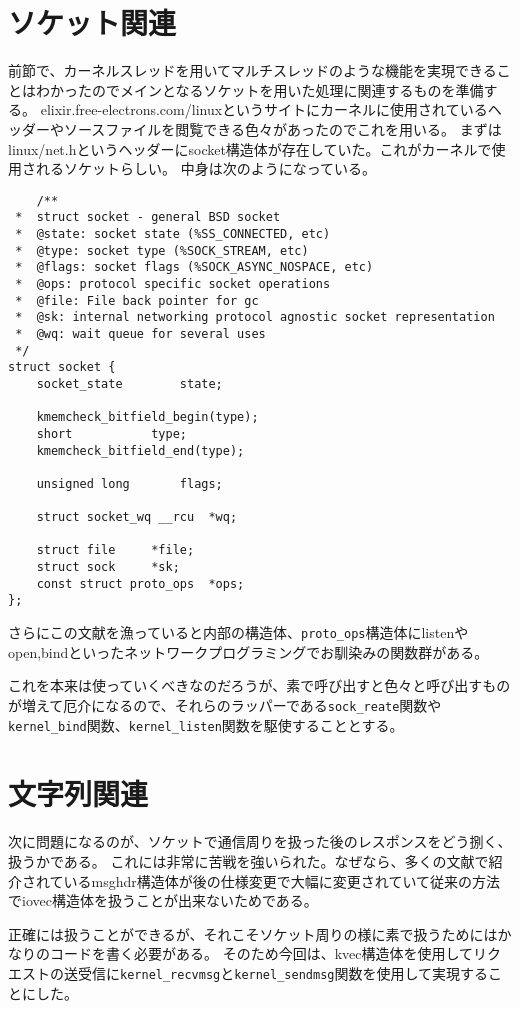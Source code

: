 \section{ソケット関連}

前節で、カーネルスレッドを用いてマルチスレッドのような機能を実現できることはわかったのでメインとなるソケットを用いた処理に関連するものを準備する。
elixir.free-electrons.com/linuxというサイトにカーネルに使用されているヘッダーやソースファイルを閲覧できる色々があったのでこれを用いる。
まずはlinux/net.hというヘッダーにsocket構造体が存在していた。これがカーネルで使用されるソケットらしい。
中身は次のようになっている。
\begin{verbatim}
    /**
 *  struct socket - general BSD socket
 *  @state: socket state (%SS_CONNECTED, etc)
 *  @type: socket type (%SOCK_STREAM, etc)
 *  @flags: socket flags (%SOCK_ASYNC_NOSPACE, etc)
 *  @ops: protocol specific socket operations
 *  @file: File back pointer for gc
 *  @sk: internal networking protocol agnostic socket representation
 *  @wq: wait queue for several uses
 */
struct socket {
	socket_state		state;

	kmemcheck_bitfield_begin(type);
	short			type;
	kmemcheck_bitfield_end(type);

	unsigned long		flags;

	struct socket_wq __rcu	*wq;

	struct file		*file;
	struct sock		*sk;
	const struct proto_ops	*ops;
};
\end{verbatim}

さらにこの文献を漁っていると内部の構造体、\verb|proto_ops|構造体にlistenやopen,bindといったネットワークプログラミングでお馴染みの関数群がある。

これを本来は使っていくべきなのだろうが、素で呼び出すと色々と呼び出すものが増えて厄介になるので、それらのラッパーである\verb|sock_reate|関数や\verb|kernel_bind|関数、\verb|kernel_listen|関数を駆使することとする。

\section{文字列関連}
次に問題になるのが、ソケットで通信周りを扱った後のレスポンスをどう捌く、扱うかである。
これには非常に苦戦を強いられた。なぜなら、多くの文献で紹介されているmsghdr構造体が後の仕様変更で大幅に変更されていて従来の方法でiovec構造体を扱うことが出来ないためである。

正確には扱うことができるが、それこそソケット周りの様に素で扱うためにはかなりのコードを書く必要がある。
そのため今回は、kvec構造体を使用してリクエストの送受信に\verb|kernel_recvmsg|と\verb|kernel_sendmsg|関数を使用して実現することにした。

